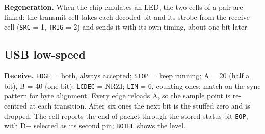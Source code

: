 \documentclass[10pt,a4paper]{article}
\newcommand{\reg}[1]{\texttt{#1}}
\begin{document}
\textbf{Regeneration.} When the chip emulates an LED, the two cells of a pair are linked: the transmit cell takes each decoded bit and its strobe from the receive cell (\reg{SRC} = 1, \reg{TRIG} = 2) and sends it with its own timing, about one bit later.


\subsection{USB low-speed}

\textbf{Receive.} \reg{EDGE} = both, always accepted; \reg{STOP} = keep running; A = 20 (half a bit), B = 40 (one
bit); \reg{LCDEC} = NRZI; \reg{LIM} = 6, counting ones; match on the sync pattern for byte alignment. Every
edge reloads A, so the sample point is re-centred at each transition. After six ones the next bit is the
stuffed zero and is dropped. The cell reports the end of packet through the stored status bit \reg{EOP}, with D$-$ selected as its second pin; \reg{BOTHL} shows the level.
\end{document}
